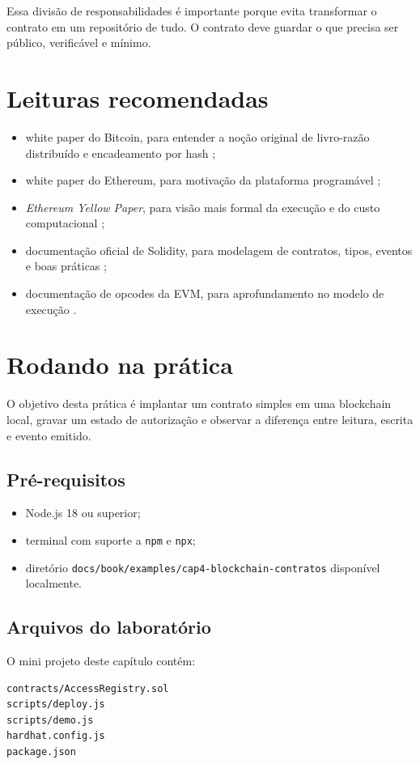 Essa divisão de responsabilidades é importante porque evita transformar o contrato em um repositório de tudo. O contrato deve guardar o que precisa ser público, verificável e mínimo.

\section{Leituras recomendadas}
\begin{itemize}[leftmargin=*]
  \item white paper do Bitcoin, para entender a noção original de livro-razão distribuído e encadeamento por hash \citep{nakamoto_bitcoin};
  \item white paper do Ethereum, para motivação da plataforma programável \citep{ethereum_whitepaper};
  \item \textit{Ethereum Yellow Paper}, para visão mais formal da execução e do custo computacional \citep{wood_ethereum};
  \item documentação oficial de Solidity, para modelagem de contratos, tipos, eventos e boas práticas \citep{solidity_docs};
  \item documentação de opcodes da EVM, para aprofundamento no modelo de execução \citep{evm_codes}.
\end{itemize}

\section{Rodando na prática}
O objetivo desta prática é implantar um contrato simples em uma blockchain local, gravar um estado de autorização e observar a diferença entre leitura, escrita e evento emitido.

\subsection{Pré-requisitos}
\begin{itemize}[leftmargin=*]
  \item Node.js 18 ou superior;
  \item terminal com suporte a \texttt{npm} e \texttt{npx};
  \item diretório \texttt{docs/book/examples/cap4-blockchain-contratos} disponível localmente.
\end{itemize}

\subsection{Arquivos do laboratório}
O mini projeto deste capítulo contém:
\begin{verbatim}
contracts/AccessRegistry.sol
scripts/deploy.js
scripts/demo.js
hardhat.config.js
package.json
\end{verbatim}

